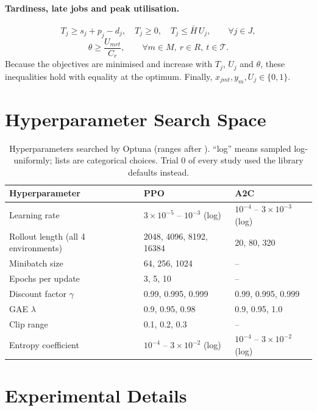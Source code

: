 \documentclass[12pt]{article}
\begin{document}
\paragraph{Tardiness, late jobs and peak utilisation.}
\begin{equation}\label{con:tardiness}
    T_j \ge s_j + p_j - d_j, \quad T_j \ge 0, \quad T_j \le \bar{H}\, U_j, \qquad \forall j \in J,
\end{equation}
\begin{equation}\label{con:theta}
    \theta \ge \frac{U_{mrt}}{C_r}, \qquad \forall m \in M,\ r \in R,\ t \in \mathcal{T}.
\end{equation}
Because the objectives are minimised and increase with $T_j$, $U_j$ and $\theta$, these inequalities hold with equality at the optimum. Finally, $x_{jmt}, y_m, U_j \in \{0, 1\}$.

\section{Hyperparameter Search Space}\label{sec:AppendixC}
\begin{table}[htbp]
\centering
\caption{Hyperparameters searched by Optuna (ranges after \cite{andrychowicz2021onpolicy}). ``log'' means sampled log-uniformly; lists are categorical choices. Trial 0 of every study used the library defaults instead.}
\label{tab:hp}
\begin{tabular}{lll}
\toprule
Hyperparameter & PPO & A2C \\
\midrule
Learning rate & $3\times10^{-5}$ -- $10^{-3}$ (log) & $10^{-4}$ -- $3\times10^{-3}$ (log) \\
Rollout length (all 4 environments) & 2048, 4096, 8192, 16384 & 20, 80, 320 \\
Minibatch size & 64, 256, 1024 & -- \\
Epochs per update & 3, 5, 10 & -- \\
Discount factor $\gamma$ & 0.99, 0.995, 0.999 & 0.99, 0.995, 0.999 \\
GAE $\lambda$ & 0.9, 0.95, 0.98 & 0.9, 0.95, 1.0 \\
Clip range & 0.1, 0.2, 0.3 & -- \\
Entropy coefficient & $10^{-4}$ -- $3\times10^{-2}$ (log) & $10^{-4}$ -- $3\times10^{-2}$ (log) \\
\bottomrule
\end{tabular}
\end{table}

\section{Experimental Details}\label{sec:AppendixD}
\end{document}
